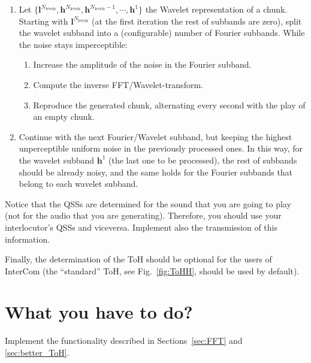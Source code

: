 \begin{enumerate}
\item Let
  $\{{\mathbf l}^{N_{\text{levels}}}, {\mathbf h}^{N_{\text{levels}}},
  {\mathbf h}^{N_{\text{levels}}-1},\cdots, {\mathbf h}^1\}$ the
  Wavelet representation of a
  chunk. %
  Starting with ${\mathbf l}^{N_{\text{levels}}}$ (at the first
  iteration the rest of subbands are zero), split the wavelet subband
  into a (configurable) number of Fourier subbands. While the noise stays
  imperceptible:
  \begin{enumerate}
  \item Increase the amplitude of the noise in the Fourier subband.
  \item Compute the inverse FFT/Wavelet-transform.
  \item Reproduce the generated chunk, alternating every second with
    the play of an empty chunk.
  \end{enumerate}
\item Continue with the next Fourier/Wavelet subband, but keeping the
  highest unperceptible uniform noise in the previously processed
  ones. In this way, for the wavelet subband ${\mathbf h}^1$ (the last
  one to be processed), the rest of subbands should be already
  noisy, and the same holds for the Fourier subbands that
  belong to each wavelet subband.
\end{enumerate}

Notice that the QSSs are determined for the sound that you are going
to play (not for the audio that you are generating). Therefore, you
should use your interlocutor's QSSs and viceversa. Implement also the
transmission of this information.

Finally, the determination of the ToH should be optional for the users of
InterCom (the ``standard'' ToH, see Fig.~\ref{fig:ToHH}, should be
used by default).

\section{What you have to do?}

Implement the functionality described in Sections~\ref{sec:FFT} and
\ref{sec:better_ToH}.

